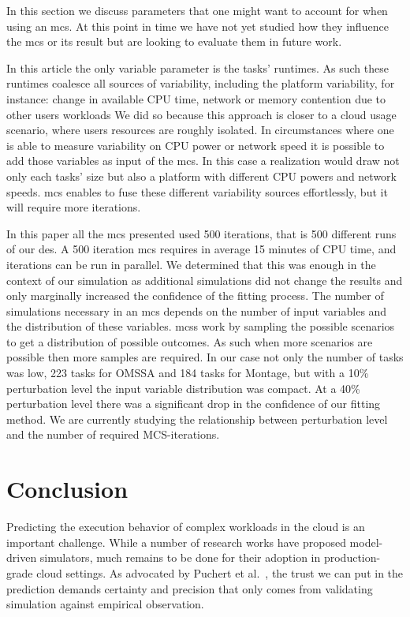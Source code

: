 \documentclass[]{llncs}
\begin{document}
In this section we discuss parameters that one might want to account for when
using an \ac{mcs}. At this point in time we have not yet studied how they
influence the \ac{mcs} or its result but are looking to evaluate them in
future work.

In this article the only variable parameter is the tasks' runtimes. As such these
runtimes coalesce all sources of variability, including the platform variability,
for instance: change in available CPU time, network or memory contention due to other users workloads
We did so because this approach is closer to a cloud usage scenario, where users
resources are roughly isolated.
In circumstances where one is able to measure variability
on CPU power or network speed it is possible to add those variables as input of
the \ac{mcs}. In this case a realization would draw not only each tasks' size 
 but also a platform with different CPU powers and network speeds.
\ac{mcs} enables to fuse these different variability sources effortlessly, but it will
require more iterations. 

In this paper all the \ac{mcs} presented used 500 iterations, that is 500
different runs of our \ac{des}. A 500 iteration \ac{mcs} requires in average 15 minutes of
CPU time, and iterations can be run in  parallel. We determined that this was enough in the
context of our simulation as additional simulations did not change the results
and only marginally increased the confidence of the fitting process. The number
of simulations necessary in an \ac{mcs} depends on the number of input variables
and the distribution of these variables. \aclp{mcs} work by sampling the possible
scenarios to get a distribution of possible outcomes. As such when more scenarios are
possible then more samples are required. In our case not only the number of
tasks
was low, 223 tasks for OMSSA and 184 tasks for Montage, but with a 10\%
perturbation level the input variable distribution was compact. At a 40\%
perturbation level there was a significant drop in the confidence of our fitting
method. We are currently studying the relationship between perturbation level
and the number of required MCS-iterations.

\section{Conclusion}
Predicting  the execution  behavior  of complex  workloads in  the  cloud is  an
important challenge. While a number of research works have proposed model-driven
simulators, much remains to be done for their adoption in production-grade cloud
settings. As  advocated by Puchert  et al.~\cite{PucherGWK15}, the trust  we can
put in  the prediction  demands certainty  and precision  that only  comes from
validating simulation against empirical observation.
\end{document}
